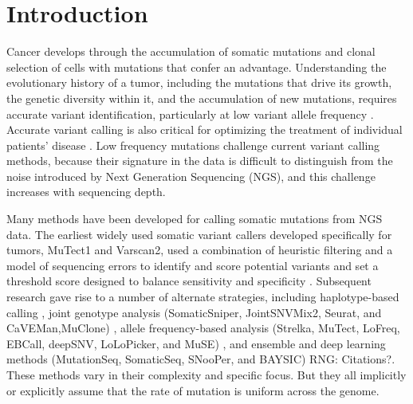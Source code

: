 \documentclass[a4,center,fleqn]{NAR}
\newcommand{\rngcomment}[1]{{\color{red}RNG: #1}}
\begin{document}
\section{Introduction}

Cancer develops through the accumulation of somatic mutations and clonal selection of cells with mutations that confer an advantage.
Understanding the evolutionary history of a tumor, including the mutations that drive its growth, the genetic diversity within it, and the accumulation of new mutations, requires accurate variant identification, particularly at low variant allele frequency \cite{Williams2016,Bozic2016,Williams2018,Shi2018}.
Accurate variant calling is also critical for optimizing the treatment of individual patients' disease \citep{Ding2012,Mardis2012,Chen2013,Borad2014,Findlay2016}.
Low frequency mutations challenge current variant calling methods, because their signature in the data is difficult to distinguish from the noise introduced by Next Generation Sequencing (NGS), and this challenge increases with sequencing depth.

Many methods have been developed for calling somatic mutations from NGS data.
The earliest widely used somatic variant callers developed specifically for tumors, MuTect1 and Varscan2, used a combination of heuristic filtering and a model of sequencing errors to identify and score potential variants and set a threshold score designed to balance sensitivity and specificity \citep{Koboldt2012,Cibulskis2013}.
Subsequent research gave rise to a number of alternate strategies, including haplotype-based calling \citep{Garrison2012},
joint genotype analysis (SomaticSniper, JointSNVMix2, Seurat, and CaVEMan,MuClone) \cite{Larson2012,Roth2012a,Christoforides2013,Jones2016,Dorri2019}, allele frequency-based analysis (Strelka, MuTect, LoFreq, EBCall, deepSNV, LoLoPicker, and MuSE) \citep{Saunders2012,Wilm2012,Shiraishi2013b,Gerstung2012,Carrot-Zhang2017,Fan2016}, and ensemble and deep learning methods (MutationSeq, SomaticSeq, SNooPer, and BAYSIC) \rngcomment{Citations?}.
These methods vary in their complexity and specific focus.
But they all implicitly or explicitly assume that the rate of mutation is uniform across the genome.
\end{document}
